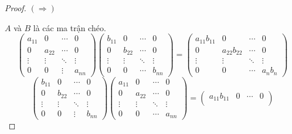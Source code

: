 \documentclass[class=linearalgebra,crop=false]{standalone}
\begin{document}
\begin{proof}
    $(\Rightarrow)$
    \par $A$ và $B$ là các ma trận chéo.
    \[
        \begin{pmatrix}
            a_{11} & 0      & \cdots & 0      \\
            0      & a_{22} & \cdots & 0      \\
            \vdots & \vdots & \ddots & \vdots \\
            0      & 0      & \vdots & a_{nn}
        \end{pmatrix}
        \begin{pmatrix}
            b_{11} & 0      & \cdots & 0      \\
            0      & b_{22} & \cdots & 0      \\
            \vdots & \vdots & \ddots & \vdots \\
            0      & 0      & \cdots & b_{nn}
        \end{pmatrix}
        =
        \begin{pmatrix}
            a_{11}b_{11} & 0            & \cdots & 0          \\
            0            & a_{22}b_{22} & \cdots & 0          \\
            \vdots       & \vdots       & \ddots & \vdots     \\
            0            & 0            & \cdots & a_{n}b_{n}
        \end{pmatrix}
    \]
    \[
        \begin{pmatrix}
            b_{11} & 0      & \cdots & 0      \\
            0      & b_{22} & \cdots & 0      \\
            \vdots & \vdots & \ddots & \vdots \\
            0      & 0      & \vdots & b_{nn}
        \end{pmatrix}
        \begin{pmatrix}
            a_{11} & 0      & \cdots & 0      \\
            0      & a_{22} & \cdots & 0      \\
            \vdots & \vdots & \ddots & \vdots \\
            0      & 0      & \cdots & a_{nn}
        \end{pmatrix}
        =
        \begin{pmatrix}
            a_{11}b_{11} & 0            & \cdots & 0          \\

\end{pmatrix}\]
\end{proof}
\end{document}
